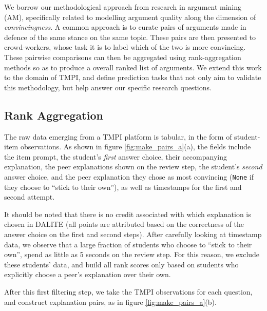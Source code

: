 \documentclass[notitlepage,12pt]{jedm}
\begin{document}
We borrow our methodological approach from research in argument mining (AM), 
specifically related to modelling argument quality along the dimension of 
\textit{convincingness}.
A common approach is to curate pairs of arguments made in defence of the same 
stance on the same topic.
These pairs are then presented to crowd-workers, whose task it is to label 
which of the two is more convincing. 
These pairwise comparisons can then be aggregated using rank-aggregation 
methods so as to produce a overall ranked list of arguments.
We extend this work to the domain of TMPI, and define prediction tasks that not 
only aim to validate this methodology, but help answer our specific research 
questions.

\subsection{Rank Aggregation}
The raw data emerging from a TMPI platform is tabular, in the form of 
student-item observations.
As shown in figure \ref{fig:make_pairs_a}(a), the fields include the item 
prompt, the student's \textit{first} answer choice, their accompanying 
explanation, the peer explanations shown on the review step, the student's 
\textit{second} answer choice, and the peer explanation they chose as most 
convincing (\verb|None| if they choose to ``stick to their own''), as well as 
timestamps for the first and second attempt.

It should be noted that there is no credit associated with which explanation is 
chosen in DALITE (all points are attributed based on the  correctness of the 
answer choice on the first and second steps).
After carefully looking at timestamp data, we observe that a large fraction of 
students who choose to ``stick to their own'', spend as little as 5 seconds on 
the review step.
For this reason, we exclude these students' data, and build all rank scores 
only based on students who explicitly choose a peer's explanation over their 
own.

After this first filtering step, we take the TMPI observations for each 
question, and construct explanation pairs, as in figure 
\ref{fig:make_pairs_a}(b).
\end{document}
